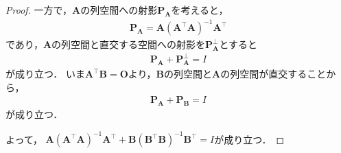 \documentclass[dvipdfmx,10pt, a4j]{jarticle}
\theoremstyle{definition}
\begin{document}
\begin{proof}
一方で，$\bm{A}$の列空間への射影$\bm{\bm{P}}_{\bm{A}}$を考えると，
\begin{align*}
    \bm{P}_{\bm{A}} = \bm{A}(\bm{A}^{\top}\bm{A})^{-1}\bm{A}^{\top}
\end{align*}
であり，$\bm{A}$の列空間と直交する空間への射影を$\bm{P}^{\bot}_{\bm{A}}$とすると
\begin{align*}
    \bm{P}_{\bm{A}} + \bm{P}^{\bot}_{\bm{A}} = I
\end{align*}
が成り立つ．
いま$\bm{A}^{\top}\bm{B}=\bm{O}$より，$\bm{B}$の列空間と$\bm{A}$の列空間が直交することから，
\begin{align*}
    \bm{P}_{\bm{A}} + \bm{P}_{\bm{B}} = I
\end{align*}
が成り立つ．

よって，
$\bm{A}(\bm{A}^{\top}\bm{A})^{-1}\bm{A}^{\top} + \bm{B}(\bm{B}^{\top}\bm{B})^{-1}\bm{B}^{\top} = I$が成り立つ．

\end{proof}
\end{document}
